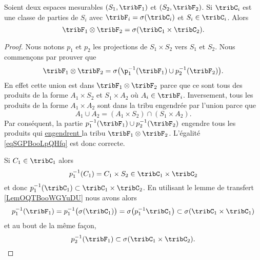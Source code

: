 \begin{proposition}        \label{PropLJJWooKqWlTr}
    Soient deux espaces mesurables \( (S_1,\tribF_1)\) et \( (S_2,\tribF_2)\). Si \( \tribC_i\) est une classe de parties de \( S_i\) avec \( \tribF_i=\sigma(\tribC_i)\) et \( S_i\in\tribC_i\). Alors 
    \begin{equation}
        \tribF_1\otimes \tribF_2=\sigma(\tribC_1\times \tribC_2).
    \end{equation}
\end{proposition}

\begin{proof}
    Nous notons \( p_1\) et \( p_2\) les projections de \( S_1\times S_2\) vers \( S_1\) et \( S_2\). Nous commençons par prouver que
    \begin{equation}    \label{eqSGPBooLpQHfq}
        \tribF_1\otimes \tribF_2=\sigma\big( \p_1^{-1}(\tribF_1)\cup p_2^{-1}(\tribF_2) \big).
    \end{equation}
    En effet cette union est dans \( \tribF_1\otimes \tribF_2\) parce que ce sont tous des produits de la forme \( A_1\times S_2\) et \( S_1\times A_2\) où \( A_i\in \tribF_i\). Inversement, tous les produits de la forme \( A_1\times A_2\) sont dans la tribu engendrée par l'union parce que
    \begin{equation}
        A_1\cup A_2=(A_1\times S_2)\cap(S_1\times A_2).
    \end{equation}
    Par conséquent, la partie \( p_1^{-1}(\tribF_1)\cup p_2^{-1}(\tribF_2)\) engendre tous les produits qui \href{ https://fr.wikisource.org/wiki/Bible_Crampon_1923/Matthieu }{ engendrent } la tribu \( \tribF_1\otimes\tribF_2\). L'égalité \eqref{eqSGPBooLpQHfq} est donc correcte.
    
    Si \( C_1\in\tribC_1\) alors
    \begin{equation}
        p_1^{-1}(C_1)=C_1\times S_2\in\tribC_1\times \tribC_2
    \end{equation}
    et donc \( p_1^{-1}(\tribC_1)\subset \tribC_1\times \tribC_2\). En utilisant le lemme de transfert \ref{LemOQTBooWGYuDU} nous avons alors
    \begin{equation}        \label{EqDQLYooVOLqMZ}
        p_1^{-1}(\tribF_1)=p_1^{-1}\big( \sigma(\tribC_1) \big)=\sigma\big( p_1^{-1}\tribC_1 \big)\subset\sigma(\tribC_1\times \tribC_1)
    \end{equation}
    et au bout de la même façon,
    \begin{equation}        \label{EqMTRCooVHNTHJ}
        p_2^{-1}(\tribF_1)\subset\sigma(\tribC_1\times \tribC_2).
    \end{equation}


\end{proof}
